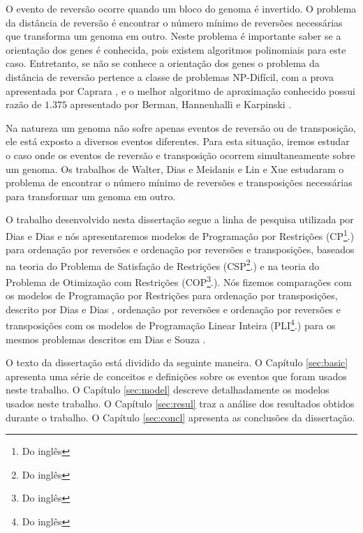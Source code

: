 O evento de reversão ocorre quando um bloco do genoma é invertido. O
problema da distância de reversão é encontrar o número mínimo de
reversões necessárias que transforma um genoma em outro. Neste
problema é importante saber se a orientação dos genes é conhecida,
pois existem algoritmos polinomiais para este caso. Entretanto, se não
se conhece a orientação dos genes o problema da distância de reversão
pertence a classe de problemas NP-Difícil, com a prova apresentada por
Caprara \cite{Caprara*1997}, e o melhor algoritmo de aproximação
conhecido possui razão de $1.375$ apresentado por Berman,
Hannenhalli e Karpinski \cite{BermanHannenhalliKarpinski*2002}.

Na natureza um genoma não sofre apenas eventos de reversão ou de
transposição, ele está exposto a diversos eventos diferentes. Para
esta situação, iremos estudar o caso onde os eventos de reversão e
transposição ocorrem simultaneamente sobre um genoma. Os trabalhos de
Walter, Dias e
Meidanis \cite{MeidanisWalterDias*2002,WalterDiasMeidanis*1998} e Lin
e Xue \cite{LinXue*1999} estudaram o problema de encontrar o número
mínimo de reversões e transposições necessárias para transformar um
genoma em outro.

O trabalho desenvolvido nesta dissertação segue a linha de pesquisa
utilizada por Dias e Dias \cite{DiasDias*2009} e nós apresentaremos
modelos de Programação por Restrições (CP\footnote{Do
inglês }.) para ordenação por reversões e
ordenação por reversões e transposições, baseados na teoria do
Problema de Satisfação de Restrições (CSP\footnote{Do
inglês }.) e na teoria do
Problema de Otimização com Restrições (COP\footnote{Do
inglês }.). Nós fizemos
comparações com os modelos de Programação por Restrições para
ordenação por transposições, descrito por Dias e
Dias \cite{DiasDias*2009}, ordenação por reversões e ordenação por
reversões e transposições com os modelos de Programação Linear Inteira
(PLI\footnote{Do inglês }.) para os
mesmos problemas descritos em Dias e Souza \cite{DiasSouza*2007}.

O texto da dissertação está dividido da seguinte maneira. O
Capítulo \ref{sec:basic} apresenta uma série de conceitos e definições
sobre os eventos que foram usados neste trabalho. O
Capítulo \ref{sec:model} descreve detalhadamente os modelos usados
neste trabalho. O Capítulo \ref{sec:resul} traz a análise dos
resultados obtidos durante o trabalho. O Capítulo \ref{sec:concl}
apresenta as conclusões da dissertação.
